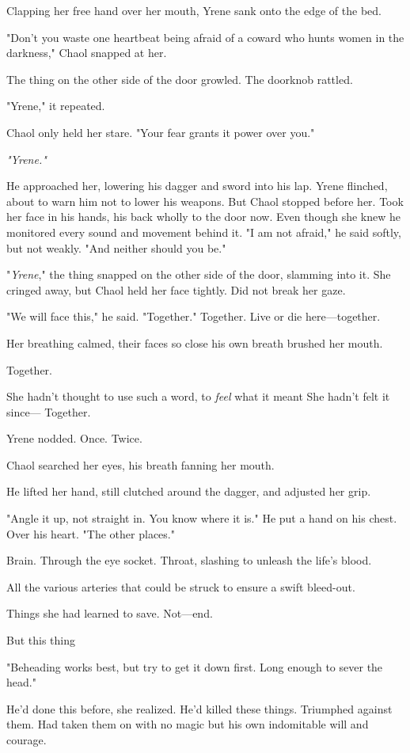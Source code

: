Clapping her free hand over her mouth, Yrene sank onto the edge of the bed.

"Don't you waste one heartbeat being afraid of a coward who hunts women in the darkness," Chaol snapped at her.

The thing on the other side of the door growled. The doorknob rattled.

"Yrene," it repeated.

Chaol only held her stare. "Your fear grants it power over you."

\emph{"Yrene."}

He approached her, lowering his dagger and sword into his lap. Yrene flinched, about to warn him not to lower his weapons. But Chaol stopped before her. Took her face in his hands, his back wholly to the door now. Even though she knew he monitored every sound and movement behind it. "I am not afraid," he said softly, but not weakly. "And neither should you be."

"\emph{Yrene}," the thing snapped on the other side of the door, slamming into it. She cringed away, but Chaol held her face tightly. Did not break her gaze.

"We will face this," he said. "Together." Together. Live or die here---together.

Her breathing calmed, their faces so close his own breath brushed her mouth.

Together.

She hadn't thought to use such a word, to \emph{feel} what it meant
 She hadn't felt it since--- Together.

Yrene nodded. Once. Twice.

Chaol searched her eyes, his breath fanning her mouth.

He lifted her hand, still clutched around the dagger, and adjusted her grip.

"Angle it up, not straight in. You know where it is." He put a hand on his chest. Over his heart. "The other places."

Brain. Through the eye socket. Throat, slashing to unleash the life's blood.

All the various arteries that could be struck to ensure a swift bleed-out.

Things she had learned to save. Not---end.

But this thing 

"Beheading works best, but try to get it down first. Long enough to sever the head."

He'd done this before, she realized. He'd killed these things. Triumphed against them. Had taken them on with no magic but his own indomitable will and courage.

